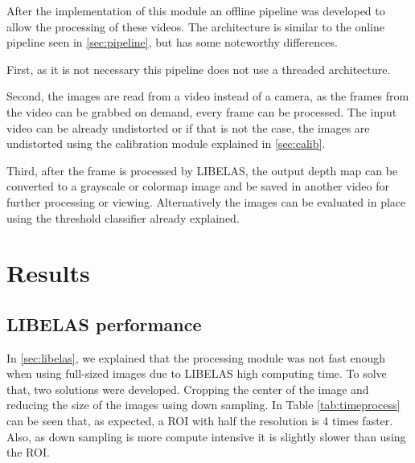 \documentclass[10pt,a4paper,twocolumn,twoside]{article}
\begin{document}
	After the implementation of this module an offline pipeline was developed to allow the processing of these videos. The architecture is similar to the online pipeline seen in \ref{sec:pipeline}, but has some noteworthy differences.  
	
	First, as it is not necessary this pipeline does not use a threaded architecture.
	
	Second, the images are read from a video instead of a camera, as the frames from the video can be grabbed on demand, every frame can be processed. The input video can be already undistorted or if that is not the case, the images are undistorted using the calibration module explained in \ref{sec:calib}. 
	
	Third, after the frame is processed by LIBELAS, the output depth map can be converted to a grayscale or colormap image and be saved in another video for further processing or viewing. Alternatively the images can be evaluated in place using the threshold classifier already explained.  
	

	
	\section{Results}
	
	
	\subsection{LIBELAS performance}
	\label{sec:resizeperformance}
	In \ref{sec:libelas}, we explained that the processing module was not fast enough when using full-sized images due to LIBELAS high computing time. To solve that, two solutions were developed. Cropping the center of the image and reducing the size of the images using down sampling. In Table \ref{tab:timeprocess} can be seen that, as expected, a ROI with half the resolution is 4 times faster. Also, as down sampling is more compute intensive it is slightly slower than using the ROI.  
	
\end{document}
